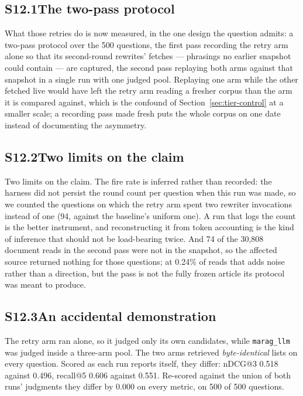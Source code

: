 \documentclass[acmsmall,anonymous,screen]{acmart}
\begin{document}
\subsection*{S12.1\quad The two-pass protocol}
What those retries do is now measured, in the one
design the question admits: a two-pass protocol over the 500 questions, the
first pass recording the retry arm alone so that its second-round rewrites'
fetches --- phrasings no earlier snapshot could contain --- are captured, the
second pass replaying both arms against that snapshot in a single run with one
judged pool. Replaying one arm while the other fetched live would have left the
retry arm reading a fresher corpus than the arm it is compared against, which
is the confound of Section~\ref{sec:tier-control} at a smaller scale; a
recording pass made fresh puts the whole corpus on one date instead of
documenting the asymmetry.

\subsection*{S12.2\quad Two limits on the claim}
Two limits on the claim. The fire rate is inferred rather than recorded: the
harness did not persist the round count per question when this run was made, so
we counted the questions on which the retry arm spent two rewriter invocations
instead of one (94, against the baseline's uniform one). A run that logs the
count is the better instrument, and reconstructing it from token accounting is
the kind of inference that should not be load-bearing twice. And 74 of the 30{,}808 document reads in the second
pass were not in the snapshot, so the affected source returned nothing for
those questions; at 0.24\% of reads that adds noise rather than a direction,
but the pass is not the fully frozen article its protocol was meant to
produce.

\subsection*{S12.3\quad An accidental demonstration}

The retry arm ran alone, so it judged only its own candidates, while
\texttt{marag\_llm} was judged inside a three-arm pool. The two arms retrieved
\emph{byte-identical} lists on every question. Scored as each run reports
itself, they differ: nDCG@3 0.518 against 0.496, recall@5 0.606 against 0.551.
Re-scored against the union of both runs' judgments they differ by $0.000$ on
every metric, on 500 of 500 questions.
\end{document}
